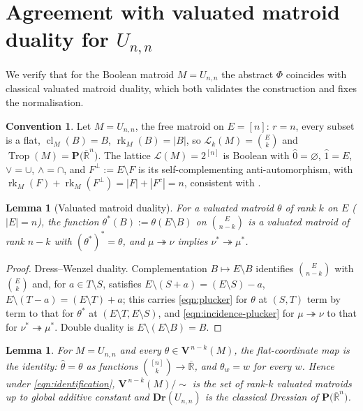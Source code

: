 \documentclass{article}
\newtheorem{lemma}[theorem]{Lemma}
\theoremstyle{definition}
\newtheorem{convention}[theorem]{Convention}
\newcommand{\Rbar}{\overline{\mathbb{R}}}
\newcommand{\rk}{\operatorname{rk}}
\newcommand{\cl}{\operatorname{cl}}
\newcommand{\Trop}{\operatorname{Trop}}
\newcommand{\onto}{\twoheadrightarrow}
\newcommand{\Dr}{\mathbf{Dr}}
\newcommand{\bV}{\mathbf V}
\newcommand{\cLL}{\mathcal{L}}
\newcommand{\PT}[1]{\mathbf{P}\big(\Rbar^{#1}\big)}
\begin{document}
\section{Agreement with valuated matroid duality for \texorpdfstring{$U_{n,n}$}{U(n,n)}}\label{sec:Unn}

We verify that for the Boolean matroid $M=U_{n,n}$ the abstract $\Phi$ coincides with classical
valuated matroid duality, which both validates the construction and fixes the normalisation.

\begin{convention}\label{conv:Unn}
Let $M=U_{n,n}$, the free matroid on $E=[n]$: $r=n$, every subset is a flat, $\cl_M(B)=B$,
$\rk_M(B)=|B|$, so $\cLL_k(M)=\binom{E}{k}$ and $\Trop(M)=\PT{n}$. The lattice $\cLL(M)=2^{[n]}$ is
Boolean with $\hat0=\varnothing$, $\hat1=E$, $\vee=\cup$, $\wedge=\cap$, and $F^{\perp}:=E\setminus F$
is its self-complementing anti-automorphism, with $\rk_M(F)+\rk_M(F^{\perp})=|F|+|F^c|=n$, consistent
with .
\end{convention}

\begin{lemma}[Valuated matroid duality]\label{fact:dual}
For a valuated matroid $\theta$ of rank $k$ on $E$ ($|E|=n$), the function $\theta^{*}(B):=\theta(E
\setminus B)$ on $\binom{E}{n-k}$ is a valuated matroid of rank $n-k$ with $(\theta^{*})^{*}=\theta$,
and $\mu\onto\nu$ implies $\nu^{*}\onto\mu^{*}$.
\end{lemma}

\begin{proof}
Dress--Wenzel duality. Complementation $B\mapsto E\setminus B$ identifies $\binom{E}{n-k}$ with
$\binom{E}{k}$ and, for $a\in T\setminus S$, satisfies $E\setminus(S+a)=(E\setminus S)-a$,
$E\setminus(T-a)=(E\setminus T)+a$; this carries \eqref{eqn:plucker} for $\theta$ at $(S,T)$ term by
term to that for $\theta^{*}$ at $(E\setminus T,E\setminus S)$, and \eqref{eqn:incidence-plucker} for
$\mu\onto\nu$ to that for $\nu^{*}\onto\mu^{*}$. Double duality is $E\setminus(E\setminus B)=B$.
\end{proof}

\begin{lemma}\label{lem:Unn-flatcoord}
For $M=U_{n,n}$ and every $\theta\in\bV^{\,n-k}(M)$, the flat-coordinate map is the identity:
$\widehat\theta=\theta$ as functions $\binom{[n]}{k}\to\Rbar$, and $\theta_w=w$ for every $w$. Hence
under \eqref{eqn:identification}, $\bV^{\,n-k}(M)/\!\sim$ is the set of rank-$k$ valuated matroids up
to global additive constant and $\Dr(U_{n,n})$ is the classical Dressian of $\PT{n}$.
\end{lemma}
\end{document}
